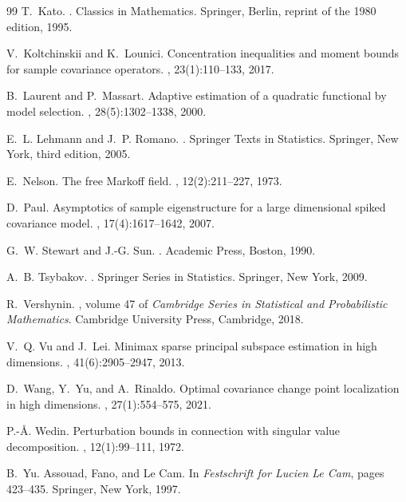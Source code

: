 \documentclass[11pt]{article}
\theoremstyle{tightplain}
\theoremstyle{tightdef}
\begin{document}
\begin{thebibliography}{99}
T.~Kato.
.
\newblock Classics in Mathematics. Springer, Berlin, reprint of the 1980
edition, 1995.

V.~Koltchinskii and K.~Lounici.
\newblock Concentration inequalities and moment bounds for sample covariance
operators.
, 23(1):110--133, 2017.

B.~Laurent and P.~Massart.
\newblock Adaptive estimation of a quadratic functional by model selection.
, 28(5):1302--1338, 2000.

E.~L. Lehmann and J.~P. Romano.
.
\newblock Springer Texts in Statistics. Springer, New York, third edition,
2005.

E.~Nelson.
\newblock The free {M}arkoff field.
, 12(2):211--227, 1973.

D.~Paul.
\newblock Asymptotics of sample eigenstructure for a large dimensional spiked
covariance model.
, 17(4):1617--1642, 2007.

G.~W. Stewart and J.-G. Sun.
.
\newblock Academic Press, Boston, 1990.

A.~B. Tsybakov.
.
\newblock Springer Series in Statistics. Springer, New York, 2009.

R.~Vershynin.
, volume 47 of {\em Cambridge Series in Statistical and
Probabilistic Mathematics}.
\newblock Cambridge University Press, Cambridge, 2018.

V.~Q. Vu and J.~Lei.
\newblock Minimax sparse principal subspace estimation in high dimensions.
, 41(6):2905--2947, 2013.

D.~Wang, Y.~Yu, and A.~Rinaldo.
\newblock Optimal covariance change point localization in high dimensions.
, 27(1):554--575, 2021.

P.-{\AA}. Wedin.
\newblock Perturbation bounds in connection with singular value decomposition.
, 12(1):99--111, 1972.

B.~Yu.
\newblock Assouad, {F}ano, and {L}e {C}am.
\newblock In {\em Festschrift for Lucien Le Cam}, pages 423--435. Springer, New
York, 1997.

\end{thebibliography}
\end{document}

